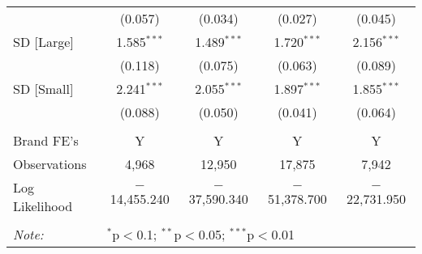 \begin{table}[!htbp]
\begin{tabular}{@{\extracolsep{5pt}}lcccc}
  & (0.057) & (0.034) & (0.027) & (0.045) \\ 
  SD [Large] & 1.585$^{***}$ & 1.489$^{***}$ & 1.720$^{***}$ & 2.156$^{***}$ \\ 
  & (0.118) & (0.075) & (0.063) & (0.089) \\ 
  SD [Small] & 2.241$^{***}$ & 2.055$^{***}$ & 1.897$^{***}$ & 1.855$^{***}$ \\ 
  & (0.088) & (0.050) & (0.041) & (0.064) \\ 
 \hline \\[-1.8ex] 
Brand FE's & Y & Y & Y & Y \\ 
Observations & 4,968 & 12,950 & 17,875 & 7,942 \\ 
Log Likelihood & $-$14,455.240 & $-$37,590.340 & $-$51,378.700 & $-$22,731.950 \\ 
\hline 
\hline \\[-1.8ex] 
\textit{Note:}  & \multicolumn{4}{l}{$^{*}$p$<$0.1; $^{**}$p$<$0.05; $^{***}$p$<$0.01} \\ 
\end{tabular} 
\end{table} 
